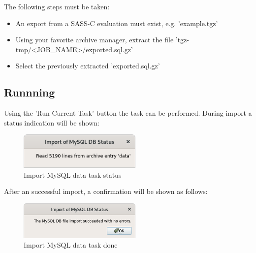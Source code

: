 The following steps must be taken:\\

\begin{itemize}  
\item An export from a SASS-C evaluation must exist, e.g. 'example.tgz'
\item Using your favorite archive manager, extract the file 'tgz-tmp/<JOB\_NAME>/exported.sql.gz'
\item Select the previously extracted 'exported.sql.gz'
\end{itemize} 

\subsection{Runnning}

Using the 'Run Current Task' button the task can be performed. During import a status indication will be shown:

\begin{figure}[H]
  \center
    \includegraphics[width=6cm]{figures/mysql_import_status.png}
  \caption{Import MySQL data task status}
\end{figure}

After an successful import, a confirmation will be shown as follows:

\begin{figure}[H]
  \center
    \includegraphics[width=6cm]{figures/mysql_import_done.png}
  \caption{Import MySQL data task done}
\end{figure}
